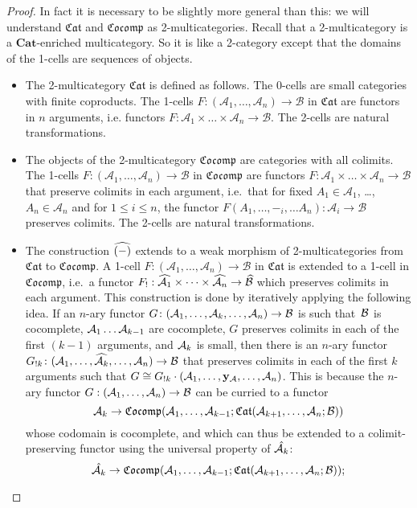 \documentclass{LMCS}
\newcommand{\CatA}{\mathcal{A}}
\newcommand{\CatB}{\mathcal{B}}
\newcommand{\Cat}{\mathbf{Cat}}
\newcommand{\TwoCatFont}[1]{\mathfrak{#1}}
\newcommand{\CAT}{\TwoCatFont{Cat}}
\newcommand{\CocompCat}{\TwoCatFont{Cocomp}}
\begin{document}
\begin{proof}
In fact it is necessary to be slightly more general than this:
we will understand $\CAT$ and $\CocompCat$ as 2-multicategories.
Recall that a 2-multicategory is a $\Cat$-enriched multicategory.
So it is like a 2-category except that 
the domains of the 1-cells are sequences of objects.
\begin{itemize}
\item The 2-multicategory $\CAT$ is defined as follows.
The 0-cells are small categories 
with finite coproducts.
The 1-cells 
${F\colon (\CatA_1,\dots,\CatA_n)\to \CatB}$ in $\CAT$ are
functors in $n$ arguments, i.e. functors 
${F\colon\CatA_1\times \dots\times \CatA_n\to \CatB}$.
The 2-cells are natural transformations.
\item 
The objects of the 2-multicategory $\CocompCat$ are 
categories with all colimits. 
The 1-cells 
$F:(\CatA_1,\dots,\CatA_n)\to \CatB$ in $\CocompCat$ are
functors $F:\CatA_1\times \dots\times \CatA_n\to \CatB$ 
that preserve colimits in each argument,
i.e.~that for fixed $A_1\in\CatA_1$, \dots, $A_n\in\CatA_n$
and for ${1\leq i\leq n}$,
the functor 
${F(A_1,\dots,-_i,\dots A_n):\CatA_i\to \CatB}$ 
preserves colimits.
The 2-cells are natural transformations.
\item
The construction
$\widehat{(-)}$ extends to a weak morphism of 2-multicategories
from ${\CAT}$ to ${\CocompCat}$.
A 1-cell
$F:(\CatA_1,\dots,\CatA_n)\to \CatB$ in $\CAT$
is extended to 
a 1-cell in $\CocompCat$, i.e.~a functor 
${F_!:\Pshf{\CatA_1}\times\dots\times \Pshf{\CatA_n}\to \Pshf{\CatB}}$
which preserves colimits in each argument.
This construction is done by iteratively applying the 
following idea.
If an $n$-ary functor 
${G\colon (\mathcal A_1,\dots,\mathcal A_k,\dots,\mathcal A_n)\to \mathcal B}$ is 
 such that~$\mathcal B$ 
is cocomplete, $\mathcal A_1\dots\mathcal A_{k-1}$ are cocomplete, 
$G$ preserves colimits in each of the first ${(k-1)}$ arguments,
and $\mathcal A_k$ is small, 
then there is an $n$-ary functor 
$G_{!k}\colon (\mathcal A_1,\dots,\widehat{\mathcal A_k},\dots,\mathcal A_n)\to \mathcal B$ 
that preserves colimits in each of the first $k$ arguments
such that 
$G\cong G_{!k}\cdot (\mathcal A_1,\dots,\mathbf{y}_\mathcal A,\dots,\mathcal A_n)$.
This is because the $n$-ary functor $G:(\mathcal A_1,\dots,\mathcal A_n)\to \mathcal B$ 
can be curried to a functor
\[\ACat_k\to \CocompCat(\ACat_1,\dots,\ACat_{k-1};\CAT(\ACat_{k+1},\dots,\ACat_n;\BCat))\]
whose codomain is cocomplete,
and which can thus be extended to a colimit-preserving
functor 
using the universal property of $\hat{\mathcal A_k}$:
\[\hat{\ACat_k}\to \CocompCat(\ACat_1,\dots,\ACat_{k-1};\CAT(\ACat_{k+1},\dots,\ACat_n;\BCat))\text;\]

\end{itemize}
\end{proof}
\end{document}
